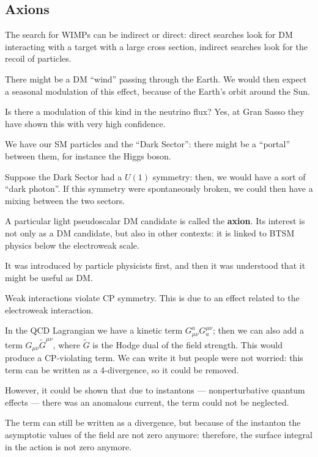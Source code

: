 \documentclass[main.tex]{subfiles}
\begin{document}
\subsection{Axions}


The search for WIMPs can be indirect or direct: direct searches look for DM interacting with a target with a large cross section, indirect searches look for the recoil of particles. 

There might be a DM ``wind'' passing through the Earth. We would then expect a seasonal modulation of this effect, because of the Earth's orbit around the Sun.

Is there a modulation of this kind in the neutrino flux? Yes, at Gran Sasso they have shown this with very high confidence. 

We have our SM particles and the ``Dark Sector'': there might be a ``portal'' between them, for instance the Higgs boson.

Suppose the Dark Sector had a \(U(1)\) symmetry: then, we would have a sort of ``dark photon''. 
If this symmetry were spontaneously broken, we could then have a mixing between the two sectors.

A particular light pseudoscalar DM candidate is called the \textbf{axion}. 
Its interest is not only as a DM candidate, but also in other contexts: it is linked to BTSM physics below the electroweak scale.

It was introduced by particle physicists first, and then it was understood that it might be useful as DM.

Weak interactions violate CP symmetry. This is due to an effect related to the electroweak interaction. 

In the QCD Lagrangian we have a kinetic term \(G_{\mu \nu }^{a} G^{\mu \nu }_{a}\); then we can also add a term \(G_{\mu \nu } \widetilde{G}^{\mu \nu }\), where \(\widetilde{G}\) is the Hodge dual of the field strength.
This would produce a CP-violating term. We can write it but people were not worried: this term can be written as a 4-divergence, so it could be removed.

However, it could be shown that due to instantons --- nonperturbative quantum effects --- there was an anomalous current, the term could not be neglected. 

The term can still be written as a divergence, but because of the instanton the asymptotic values of the field are not zero anymore: therefore, the surface integral in the action is not zero anymore. 
\end{document}
